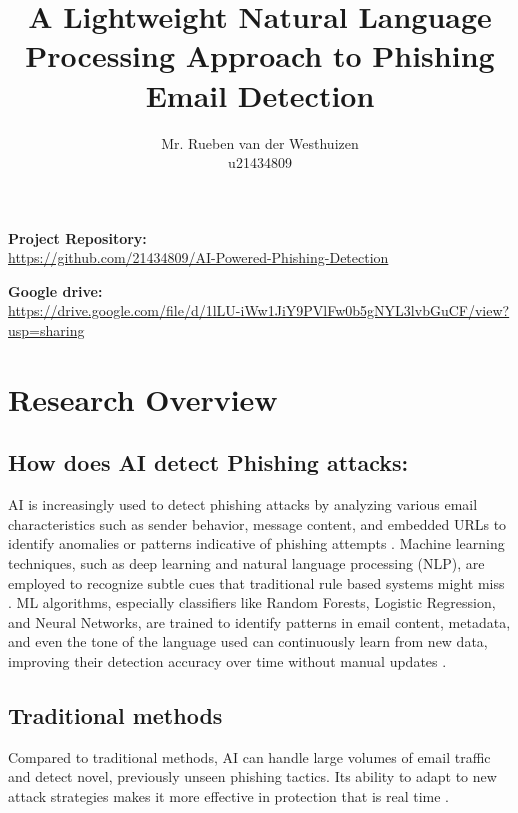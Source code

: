 \documentclass{article}
\title{A Lightweight Natural Language Processing Approach to Phishing Email Detection}
\author{Mr. Rueben van der Westhuizen \\ u21434809}
\begin{document}
\maketitle

\begin{center}
\textbf{Project Repository:} \\[0.5em]
\href{https://github.com/21434809/AI-Powered-Phishing-Detection}{https://github.com/21434809/AI-Powered-Phishing-Detection}
\end{center}
\begin{center}
\textbf{Google drive:} \\[0.5em]
\href{ https://drive.google.com/file/d/1lLU-iWw1JiY9PVlFw0b5gNYL3lvbGuCF/view?usp=sharing}{ https://drive.google.com/file/d/1lLU-iWw1JiY9PVlFw0b5gNYL3lvbGuCF/view?usp=sharing}
\end{center}
\newpage
\tableofcontents
\newpage

\section{Research Overview}

\subsection{How does AI detect Phishing attacks:}

AI is increasingly used to detect phishing attacks by analyzing various email characteristics such as sender behavior, message content, and embedded URLs to identify anomalies or patterns indicative of phishing attempts \cite{basit2021comprehensive}. Machine learning techniques, such as deep learning and natural language processing (NLP), are employed to recognize subtle cues that traditional rule  based systems might miss \cite{Wang2020Feature} \cite{Lauriola2021An}. ML algorithms, especially classifiers like Random Forests, Logistic Regression, and Neural Networks, are trained to identify patterns in email content, metadata, and even the tone of the language used can continuously learn from new data, improving their detection accuracy over time without manual updates \cite{Karim2019A} \cite{Murti2023Machine}.

\subsection{Traditional methods}

Compared to traditional methods, AI can handle large volumes of email traffic and detect novel, previously unseen phishing tactics. Its ability to adapt to new attack strategies makes it more effective in protection that is real time \cite{Jalil2022Highly} \cite{Alsariera2020AI} \cite{Basit2020A}.
\end{document}
